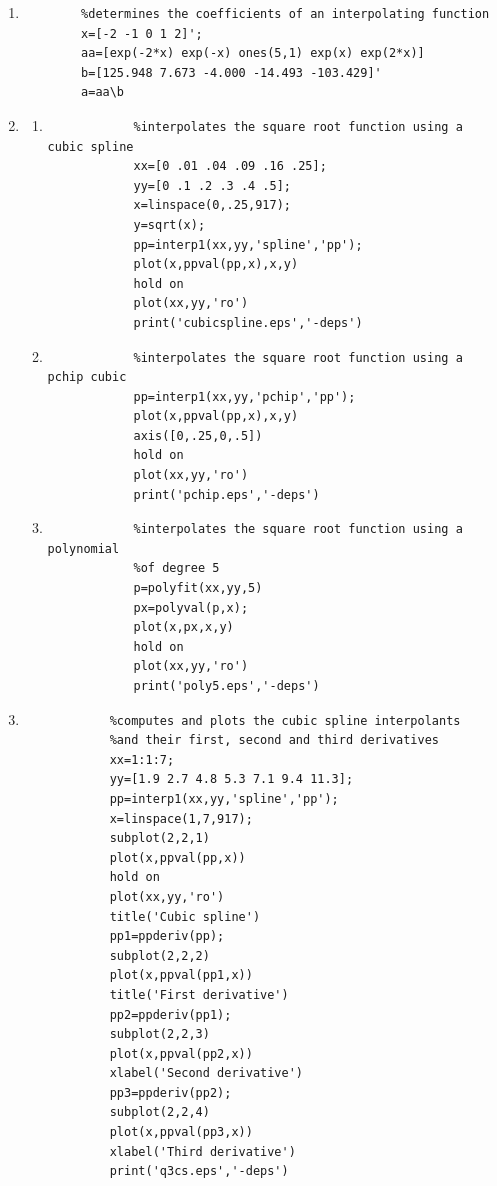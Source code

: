 \documentclass[11pt,a4paper]{article}
\begin{document}
\begin{enumerate}

	\item
	\begin{verbatim}
		%determines the coefficients of an interpolating function
		x=[-2 -1 0 1 2]';
		aa=[exp(-2*x) exp(-x) ones(5,1) exp(x) exp(2*x)]
		b=[125.948 7.673 -4.000 -14.493 -103.429]'
		a=aa\b	
	\end{verbatim}

	\item
	\begin{enumerate}
		\item
		\begin{verbatim}
			%interpolates the square root function using a cubic spline
			xx=[0 .01 .04 .09 .16 .25];
			yy=[0 .1 .2 .3 .4 .5];
			x=linspace(0,.25,917);
			y=sqrt(x);
			pp=interp1(xx,yy,'spline','pp');
			plot(x,ppval(pp,x),x,y)
			hold on
			plot(xx,yy,'ro')
			print('cubicspline.eps','-deps')
		\end{verbatim}
		
		\item
		\begin{verbatim}
			%interpolates the square root function using a pchip cubic 
			pp=interp1(xx,yy,'pchip','pp');
			plot(x,ppval(pp,x),x,y)
			axis([0,.25,0,.5])
			hold on
			plot(xx,yy,'ro')
			print('pchip.eps','-deps')
		\end{verbatim}
		
		\item
		\begin{verbatim}
			%interpolates the square root function using a polynomial
			%of degree 5 
			p=polyfit(xx,yy,5)
			px=polyval(p,x);
			plot(x,px,x,y)
			hold on
			plot(xx,yy,'ro')
			print('poly5.eps','-deps')
		\end{verbatim}
		
	\end{enumerate}
	
	\item	
		\begin{verbatim}
			%computes and plots the cubic spline interpolants
			%and their first, second and third derivatives
			xx=1:1:7;
			yy=[1.9 2.7 4.8 5.3 7.1 9.4 11.3];
			pp=interp1(xx,yy,'spline','pp');
			x=linspace(1,7,917);
			subplot(2,2,1)
			plot(x,ppval(pp,x))
			hold on
			plot(xx,yy,'ro')
			title('Cubic spline')
			pp1=ppderiv(pp);
			subplot(2,2,2)
			plot(x,ppval(pp1,x))
			title('First derivative')
			pp2=ppderiv(pp1);
			subplot(2,2,3)
			plot(x,ppval(pp2,x))
			xlabel('Second derivative')
			pp3=ppderiv(pp2);
			subplot(2,2,4)
			plot(x,ppval(pp3,x))
			xlabel('Third derivative')
			print('q3cs.eps','-deps')
			

\end{verbatim}
\end{enumerate}
\end{document}

